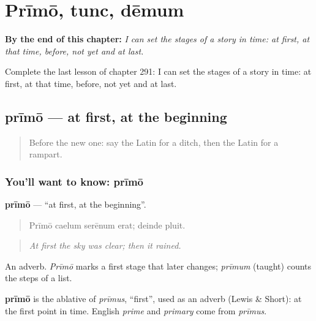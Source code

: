
\chapter{Prīmō, tunc, dēmum}
\label{ch:la-primo-tunc-demum}

\begin{chapteropening}
\textbf{By the end of this chapter:} \emph{I can set the stages of a story in time: at first, at that time, before, not yet and at last.}

Complete the last lesson of chapter 291: I can set the stages of a story in time: at first, at that time, before, not yet and at last.
\end{chapteropening}

\section[prīmō]{prīmō — at first, at the beginning}

\label{lesson:LA-C291-primo}



\begin{quote}
Before the new one: say the Latin for a ditch, then the Latin for a rampart.
\end{quote}

\subsection*{You'll want to know: prīmō}
\textbf{prīmō} — \textquotedblleft{}at first, at the beginning\textquotedblright{}.

\begin{quote}
Prīmō caelum serēnum erat; deinde pluit.
\end{quote}

\begin{quote}
\emph{At first the sky was clear; then it rained.}
\end{quote}

An adverb. \emph{Prīmō} marks a first stage that later changes; \emph{prīmum} (taught) counts the steps of a list.

\begin{cousinweb}
\textbf{prīmō} is the ablative of \emph{prīmus}, \textquotedblleft{}first\textquotedblright{}, used as an adverb (Lewis \& Short): at the first point in time. English \emph{prime} and \emph{primary} come from \emph{prīmus}.
\end{cousinweb}

